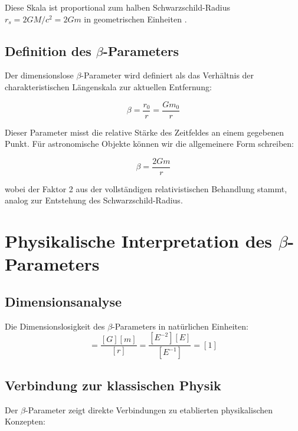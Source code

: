 	Diese Skala ist proportional zum halben Schwarzschild-Radius $r_s = 2GM/c^2 = 2Gm$ in geometrischen Einheiten \citep{misner1973,carroll2004}.
	
	\subsection{Definition des $\beta$-Parameters}
	\label{subsec:beta_definition}
	
	Der dimensionslose $\beta$-Parameter wird definiert als das Verhältnis der charakteristischen Längenskala zur aktuellen Entfernung:
	
	\begin{equation}
		\boxed{\beta = \frac{r_0}{r} = \frac{G m_0}{r}}
	\end{equation}
	
	Dieser Parameter misst die relative Stärke des Zeitfeldes an einem gegebenen Punkt. Für astronomische Objekte können wir die allgemeinere Form schreiben:
	
	\begin{equation}
		\boxed{\beta = \frac{2Gm}{r}}
	\end{equation}
	
	wobei der Faktor 2 aus der vollständigen relativistischen Behandlung stammt, analog zur Entstehung des Schwarzschild-Radius.
	
	\section{Physikalische Interpretation des $\beta$-Parameters}
	\label{sec:physical_interpretation}
	
	\subsection{Dimensionsanalyse}
	\label{subsec:dimensional_analysis}
	
	Die Dimensionslosigkeit des $\beta$-Parameters in natürlichen Einheiten:
	\begin{equation}
		[\beta] = \frac{[G][m]}{[r]} = \frac{[E^{-2}][E]}{[E^{-1}]} = [1]
	\end{equation}
	
	\subsection{Verbindung zur klassischen Physik}
	\label{subsec:classical_connection}
	
	Der $\beta$-Parameter zeigt direkte Verbindungen zu etablierten physikalischen Konzepten:
	
